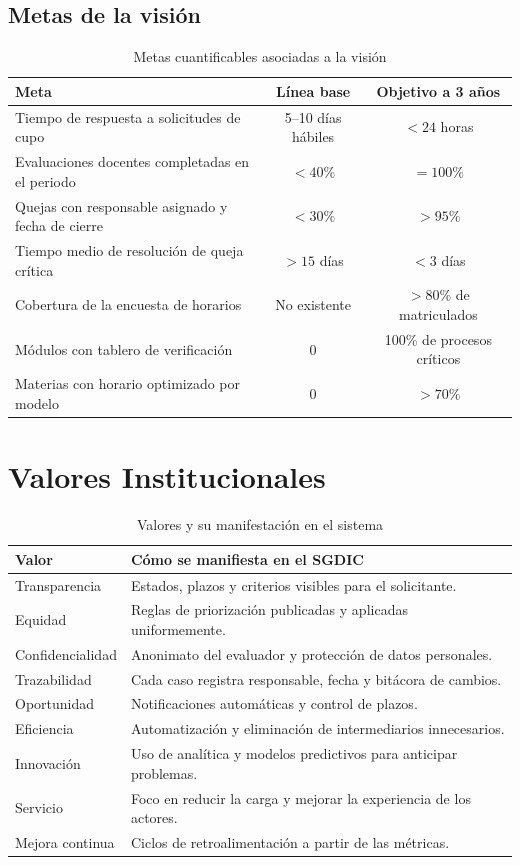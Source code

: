 \subsection{Metas de la visión}
\begin{table}[H]
\centering
\caption{Metas cuantificables asociadas a la visión}
\label{tab:metas-vision}
\small
\begin{tabularx}{\textwidth}{@{}X c c@{}}
\toprule
\rowcolor{azulClaro}
\textbf{Meta} & \textbf{Línea base} & \textbf{Objetivo a 3 años} \\
\midrule
Tiempo de respuesta a solicitudes de cupo & 5--10 días hábiles & $< 24$ horas \\
Evaluaciones docentes completadas en el periodo & $< 40\%$ & $= 100\%$ \\
Quejas con responsable asignado y fecha de cierre & $< 30\%$ & $> 95\%$ \\
Tiempo medio de resolución de queja crítica & $> 15$ días & $< 3$ días \\
Cobertura de la encuesta de horarios & No existente & $> 80\%$ de matriculados \\
Módulos con tablero de verificación & 0 & 100\% de procesos críticos \\
Materias con horario optimizado por modelo & 0 & $> 70\%$ \\
\bottomrule
\end{tabularx}
\end{table}

\section{Valores Institucionales}

\begin{table}[H]
\centering
\caption{Valores y su manifestación en el sistema}
\label{tab:valores}
\small
\begin{tabularx}{\textwidth}{@{}l X@{}}
\toprule
\rowcolor{moradoClaro}
\textbf{Valor} & \textbf{Cómo se manifiesta en el \ac{SGDIC}} \\
\midrule
Transparencia & Estados, plazos y criterios visibles para el solicitante. \\
Equidad & Reglas de priorización publicadas y aplicadas uniformemente. \\
Confidencialidad & Anonimato del evaluador y protección de datos personales. \\
Trazabilidad & Cada caso registra responsable, fecha y bitácora de cambios. \\
Oportunidad & Notificaciones automáticas y control de plazos. \\
Eficiencia & Automatización y eliminación de intermediarios innecesarios. \\
Innovación & Uso de analítica y modelos predictivos para anticipar problemas. \\
Servicio & Foco en reducir la carga y mejorar la experiencia de los actores. \\
Mejora continua & Ciclos de retroalimentación a partir de las métricas. \\
\bottomrule
\end{tabularx}
\end{table}

